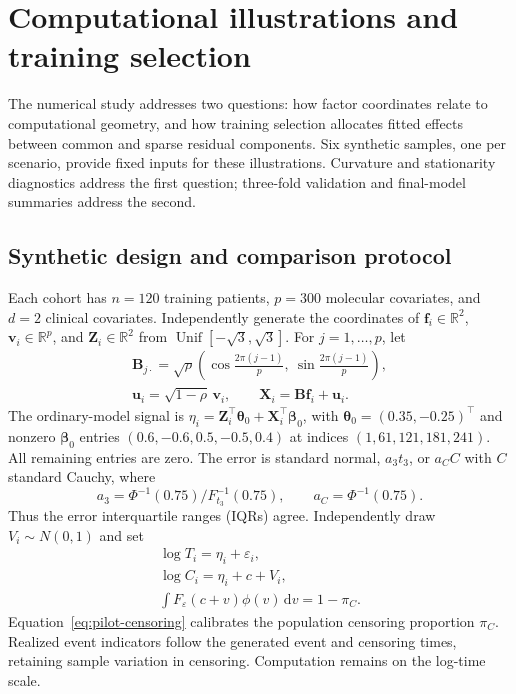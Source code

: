 \section{Computational illustrations and training selection}
\label{sec:numerical}
The numerical study addresses two questions: how factor coordinates relate to computational geometry, and how training selection allocates fitted effects between common and sparse residual components. Six synthetic samples, one per scenario, provide fixed inputs for these illustrations. Curvature and stationarity diagnostics address the first question; three-fold validation and final-model summaries address the second.

\subsection{Synthetic design and comparison protocol}
\label{subsec:cohort-design}
Each cohort has $n=120$ training patients, $p=300$ molecular covariates, and $d=2$ clinical covariates. Independently generate the coordinates of $\bm{f}_i\in\mathbb R^2$, $\bm v_i\in\mathbb R^p$, and $\bm{Z}_i\in\mathbb R^2$ from $\operatorname{Unif}[-\sqrt3,\sqrt3]$. For $j=1,\ldots,p$, let
\begin{equation}
\begin{gathered}
\bm B_{j\cdot}=\sqrt\rho
 \left(\cos\frac{2\pi(j-1)}p,\ \sin\frac{2\pi(j-1)}p\right),\\
\bm u_i=\sqrt{1-\rho}\,\bm v_i,\qquad
\bm X_i=\bm B\bm f_i+\bm u_i.
\end{gathered}
\label{eq:pilot-design}
\end{equation}
The ordinary-model signal is $\eta_i=\bm{Z}_i^\top\bm{\theta}_0+\bm{X}_i^\top\bm{\beta}_0$, with $\bm{\theta}_0=(0.35,-0.25)^\top$ and nonzero $\bm{\beta}_0$ entries $(0.6,-0.6,0.5,-0.5,0.4)$ at indices $(1,61,121,181,241)$. All remaining entries are zero. The error is standard normal, $a_3 t_3$, or $a_C C$ with $C$ standard Cauchy, where
\[
 a_3=\Phi^{-1}(0.75)/F_{t_3}^{-1}(0.75),\qquad
 a_C=\Phi^{-1}(0.75).
\]
Thus the error interquartile ranges (IQRs) agree. Independently draw $V_i\sim N(0,1)$ and set
\begin{equation}
 \begin{gathered}
\log T_i=\eta_i+\varepsilon_i,\\
 \log C_i=\eta_i+c+V_i,
 \\
 \int F_\varepsilon(c+v)\phi(v)\,\mathrm{d}v=1-\pi_C.
 \end{gathered}
 \label{eq:pilot-censoring}
\end{equation}
Equation~\eqref{eq:pilot-censoring} calibrates the population censoring proportion $\pi_C$. Realized event indicators follow the generated event and censoring times, retaining sample variation in censoring. Computation remains on the log-time scale.

